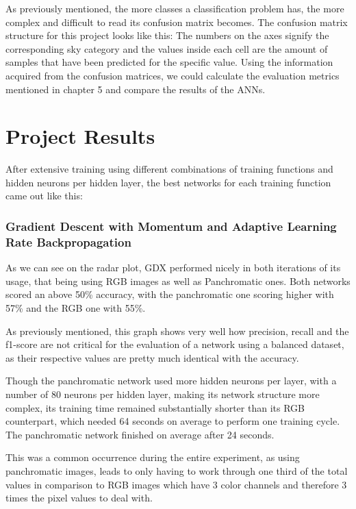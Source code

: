 As previously mentioned, the more classes a classification problem has, the more complex and difficult to read its confusion matrix becomes. The confusion matrix structure for this project looks like this:
The numbers on the axes signify the corresponding sky category and the values inside each cell are the amount of samples that have been predicted for the specific value.
Using the information acquired from the confusion matrices, we could calculate the evaluation metrics mentioned in chapter 5 and compare the results of the ANNs.

\section{Project Results}
After extensive training using different combinations of training functions and hidden neurons per hidden layer, the best networks for each training function came out like this:

\subsubsection{Gradient Descent with Momentum and Adaptive Learning Rate Backpropagation}
As we can see on the radar plot, GDX performed nicely in both iterations of its usage, that being using RGB images as well as Panchromatic ones. Both networks scored an above 50\% accuracy, with the panchromatic one scoring higher with 57\% and the RGB one with 55\%.

As previously mentioned, this graph shows very well how precision, recall and the f1-score are not critical for the evaluation of a network using a balanced dataset, as their respective values are pretty much identical with the accuracy.

Though the panchromatic network used more hidden neurons per layer, with a number of 80 neurons per hidden layer, making its network structure more complex, its training time remained substantially shorter than its RGB counterpart, which needed 64 seconds on average to perform one training cycle. The panchromatic network finished on average after 24 seconds. 

This was a common occurrence during the entire experiment, as using panchromatic images, leads to only having to work through one third of the total values in comparison to RGB images which have 3 color channels and therefore 3 times the pixel values to deal with.
